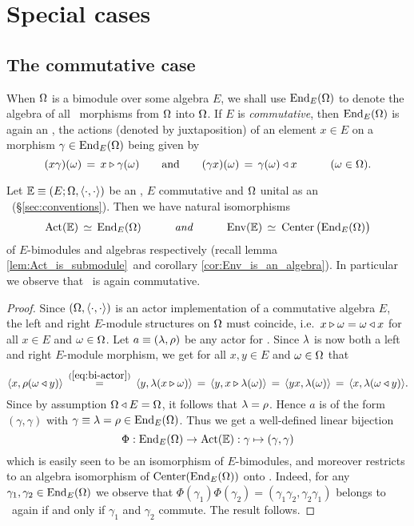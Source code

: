 
\section{Special cases}

\subsection{The commutative case} \label{par:comm_case}

When $\Om$ is a bimodule over some algebra $E$, we shall use $\mbox{\rm End}_E(\Om)$
to denote the algebra of all \Ebimod\ morphisms from $\Om$ into $\Om$.
If $E$ is {\em commutative}, then $ \mbox{\rm End}_E(\Om)$ is again an \Ebimod,
the actions (denoted by juxtaposition) of an element $x\in E$ on a morphism
$\gamma \in  \mbox{\rm End}_E(\Om)$ being given by
$$ (x \gamma)(\om) \,=\,  x \lact \gamma(\om)   \andspace{2em}
   (\gamma x)(\om) \,=\,  \gamma(\om) \ract x   \hspace{3em}  (\om \in \Om). $$


\begin{prop} \label{prop:comm_case}
  Let\/ $\EE \equiv \EOP$ be an \context, $E$ commutative and\/ $\Om$ unital as an
  \Ebimod\ \mbox{\rm (\S \ref{sec:conventions})}\@. Then we have natural isomorphisms
  $$ \ActE  \,\simeq\, \mbox{\rm End}_E(\Om)    \itandspace{3em}
     \EnvE  \,\simeq\: \mbox{\rm Center}\left(\mbox{\rm End}_E(\Om)\vertM\right) $$
  of $E$-bimodules and algebras respectively
  (recall lemma \ref{lem:Act_is_submodule}\ and corollary \ref{cor:Env_is_an_algebra}).
  In particular we observe that\/ \EnvE\ is again commutative.
\end{prop}

\begin{proof}
  Since $(\Om,\pairing)$ is an actor implementation of a commutative algebra $E$,
  the left and right $E$-module structures on $\Om$ must coincide,
  i.e.\ $x\lact \om = \om \ract x$ for all $x \in E$ and $\om \in \Om$\@.
  Let $a\equiv(\lam,\rho)$ be any actor for \EE\@.
  Since $\lam$ is now both a left and right $E$-module morphism,
  we get for all $x,y \in E$ and $\om \in \Om$ that
  $$ \pair{x}{\rho(\om \ract y)}    \:\stackrel{(\ref{eq:bi-actor})}{=}\:
                \pair{y}{\lam(x\lact\om)}
          \,=\, \pair{y}{x \lact \lam(\om)}
          \,=\, \pair{yx}{\lam(\om)}
          \,=\, \pair{x}{\lam(\om \ract y)}. $$
  Since by assumption $\Om \ract E = \Om$, it follows that $\lam=\rho$. Hence $a$ is of
  the form $(\gamma,\gamma)$ with $\gamma \equiv \lam=\rho \in {\rm End}_E(\Om)$\@.
  Thus we get a well-defined linear bijection
  $$\Phi : {\rm End}_E(\Om) \rarr \ActE : \gamma \mapsto (\gamma,\gamma)$$
  which is easily seen to be an isomorphism of $E$-bimodules,
  and moreover restricts to an algebra isomorphism
  of ${\rm Center}({\rm End}_E(\Om))$ onto \EnvE\@.
  Indeed, for any $\gamma_1,\gamma_2 \in {\rm End}_E(\Om)$ we observe that
  $ \Phi(\gamma_1) \Phi(\gamma_2) = (\gamma_1\gamma_2, \gamma_2\gamma_1) $
  belongs to \ActE\ again if and only if $\gamma_1$ and $\gamma_2$ commute.
  The result follows.
\end{proof}


